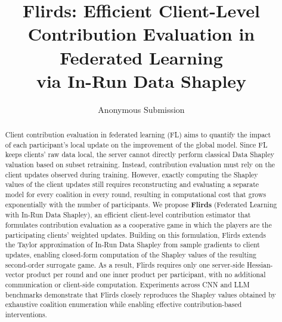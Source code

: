 \documentclass[letterpaper]{article} %
\title{Flirds: Efficient Client-Level Contribution Evaluation in Federated Learning \\ via In-Run Data Shapley}
\author{ 
    Anonymous Submission
}
\theoremstyle{definition} %
\begin{document}
\maketitle

\begin{abstract}
Client contribution evaluation in federated learning (FL) aims to quantify the impact of each participant's local update on the improvement of the global model. Since FL keeps clients' raw data local, the server cannot directly perform classical Data Shapley valuation based on subset retraining. Instead, contribution evaluation must rely on the client updates observed during training. 
However, exactly computing the Shapley values of the client updates still requires reconstructing and evaluating a separate model for every coalition in every round, resulting in computational cost that grows exponentially with the number of participants. We propose \textbf{Flirds} (Federated Learning with In-Run Data Shapley), an efficient client-level contribution
estimator that formulates contribution evaluation as a cooperative game in which the players are the participating clients' weighted updates. Building on this formulation, Flirds extends the Taylor approximation of In-Run Data Shapley from sample gradients to client updates, enabling closed-form computation of the Shapley values of the resulting second-order surrogate game. As a result, Flirds requires only one server-side Hessian-vector product per round and one inner product per participant, with no additional communication or client-side computation.
Experiments across CNN and LLM benchmarks demonstrate that Flirds closely reproduces the Shapley values obtained by exhaustive coalition enumeration while enabling effective contribution-based interventions. %
\end{abstract}
\end{document}
